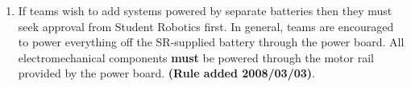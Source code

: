 \begin{enumerate}
\item If teams wish to add systems powered by separate batteries then they must seek approval from Student Robotics first.  In general, teams are encouraged to power everything off the SR-supplied battery through the power board.  All electromechanical components \textbf{must} be powered through the motor rail provided by the power board.  \textbf{(Rule added 2008/03/03)}.

\end{enumerate}
